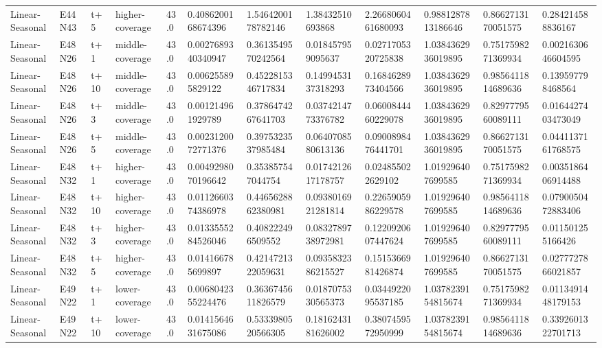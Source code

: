 \begin{landscape}
\begin{longtable}{llllllllllll}
Linear-Seasonal & E44N43 & t+5 & higher-coverage & 43.0 & 0.4086200168674396 & 1.5464200178782146 & 1.38432510693868 & 2.2668060461680093 & 0.9881287813186646 & 0.8662713170051575 & 0.284214588836167 \\
Linear-Seasonal & E48N26 & t+1 & middle-coverage & 43.0 & 0.0027689340340947 & 0.3613549570242564 & 0.018457959095637 & 0.0271705320725838 & 1.0384362936019895 & 0.7517598271369934 & 0.0021630646604595 \\
Linear-Seasonal & E48N26 & t+10 & middle-coverage & 43.0 & 0.006255895829122 & 0.4522815346717834 & 0.1499453137318293 & 0.1684628973404566 & 1.0384362936019895 & 0.9856411814689636 & 0.139597798468564 \\
Linear-Seasonal & E48N26 & t+3 & middle-coverage & 43.0 & 0.001214961929789 & 0.3786474267641703 & 0.0374214773376782 & 0.0600844460229078 & 1.0384362936019895 & 0.8297779560089111 & 0.0164427403473049 \\
Linear-Seasonal & E48N26 & t+5 & middle-coverage & 43.0 & 0.0023120072771376 & 0.3975323537985484 & 0.0640708580613136 & 0.0900898476441701 & 1.0384362936019895 & 0.8662713170051575 & 0.0441137161768575 \\
Linear-Seasonal & E48N32 & t+1 & higher-coverage & 43.0 & 0.0049298070196642 & 0.353857547044754 & 0.0174212617178757 & 0.024855022629102 & 1.019296407699585 & 0.7517598271369934 & 0.0035186406914488 \\
Linear-Seasonal & E48N32 & t+10 & higher-coverage & 43.0 & 0.0112660374386978 & 0.4465628862380981 & 0.0938016921281814 & 0.2265905986229578 & 1.019296407699585 & 0.9856411814689636 & 0.0790050472883406 \\
Linear-Seasonal & E48N32 & t+3 & higher-coverage & 43.0 & 0.0133555284526046 & 0.408222496509552 & 0.0832789738972981 & 0.1220920607447624 & 1.019296407699585 & 0.8297779560089111 & 0.011501255166426 \\
Linear-Seasonal & E48N32 & t+5 & higher-coverage & 43.0 & 0.014166785699897 & 0.4214721322059631 & 0.0935832386215527 & 0.1515366981426874 & 1.019296407699585 & 0.8662713170051575 & 0.0277727866021857 \\
Linear-Seasonal & E49N22 & t+1 & lower-coverage & 43.0 & 0.0068042355224476 & 0.3636745611826579 & 0.0187075330565373 & 0.0344922095537185 & 1.0378239154815674 & 0.7517598271369934 & 0.0113491448179153 \\
Linear-Seasonal & E49N22 & t+10 & lower-coverage & 43.0 & 0.0141564631675086 & 0.5333980520566305 & 0.1816243181626002 & 0.3807459572950999 & 1.0378239154815674 & 0.9856411814689636 & 0.3392601322701713 \\

\end{longtable}
\end{landscape}

